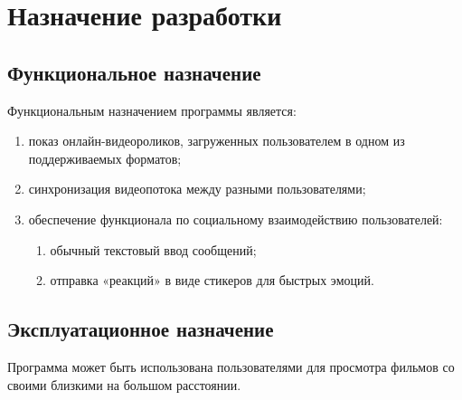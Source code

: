 \section{Назначение разработки}

\subsection{Функциональное назначение}

Функциональным назначением программы является:
\begin{enumerate}
    \item показ онлайн-видеороликов, загруженных пользователем в одном из поддерживаемых форматов;
    \item синхронизация видеопотока между разными пользователями;
    \item обеспечение функционала по социальному взаимодействию пользователей:
    \begin{enumerate}
        \item обычный текстовый ввод сообщений;
        \item отправка «реакций» в виде стикеров для быстрых эмоций.
    \end{enumerate}
\end{enumerate}

\subsection{Эксплуатационное назначение}

Программа может быть использована пользователями для просмотра фильмов со своими близкими на большом расстоянии.